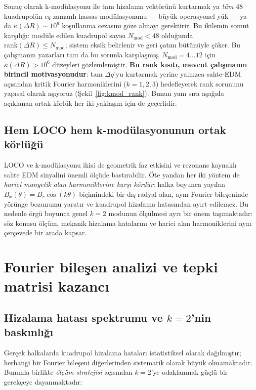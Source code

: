 \documentclass[preprint,12pt]{elsarticle}
\begin{document}
Sonuç olarak k-modülasyonu ile tam hizalama vektörünü kurtarmak ya \emph{tüm}
48 kuadrupolün eş zamanlı hassas modülasyonunu --- büyük operasyonel yük ---
ya da $\kappa(\Delta R)\sim10^6$ koşullanma cezasını göze almayı gerektirir.
Bu ikilemin somut karşılığı: modüle edilen kuadrupol sayısı $N_\mathrm{mod}<48$
olduğunda $\mathrm{rank}(\Delta R)\le N_\mathrm{mod}$; sistem eksik belirlenir
ve geri çatım bütünüyle çöker. Bu çalışmanın yazarları tam da bu sorunla
karşılaşmış, $N_\mathrm{mod}=4\ldots12$ için $\kappa(\Delta R)>10^6$
düzeyleri gözlemlemiştir.
\textbf{Bu rank kısıtı, mevcut çalışmanın birincil motivasyonudur}:
tam $\Delta q$'yu kurtarmak yerine yalnızca sahte-EDM açısından kritik
Fourier harmoniklerini ($k=1,2,3$) hedefleyerek rank sorununu yapısal
olarak aşıyoruz (Şekil~\ref{fig:kmod_rank}). Bunun yanı sıra aşağıda
açıklanan ortak körlük her iki yaklaşım için de geçerlidir.


\subsection{Hem LOCO hem k-modülasyonunun ortak körlüğü}

LOCO ve k-modülasyonu ikisi de geometrik faz etkisini ve rezonans kaynaklı
sahte EDM sinyalini önemli ölçüde bastırabilir. Öte yandan her iki yöntem de
\textit{harici manyetik alan harmoniklerine karşı kördür}: halka boyunca yayılan
$B_x(\theta)=B_r\cos(k\theta)$ biçimindeki bir dış radyal alan, aynı Fourier
bileşeninde yörünge bozunumu yaratır ve kuadrupol hizalama hatasından
ayırt edilemez. Bu nedenle örgü boyunca genel $k=2$ modunun ölçülmesi ayrı bir
önem taşımaktadır: söz konusu ölçüm, mekanik hizalama hatalarını ve harici
alan harmoniklerini aynı çerçevede bir arada kapsar.

\section{Fourier bileşen analizi ve tepki matrisi kazancı}
\label{sec:fourier}

\subsection{Hizalama hatası spektrumu ve $k=2$'nin baskınlığı}

Gerçek halkalarda kuadrupol hizalama hataları istatistiksel olarak dağılmıştır;
herhangi bir Fourier bileşeni diğerlerinden sistematik olarak büyük olmamaktadır.
Bununla birlikte \textit{ölçüm stratejisi} açısından $k=2$'ye odaklanmak
güçlü bir gerekçeye dayanmaktadır:
\end{document}
